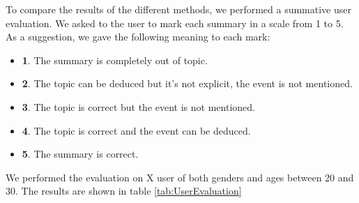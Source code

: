 To compare the results of the different methods, we performed a summative user evaluation. We asked to the user to mark each summary in a scale from 1 to 5. As a suggestion, we gave the following meaning to each mark:
\begin{itemize}
\item \textbf{1}. The summary is completely out of topic.
\item \textbf{2}. The topic can be deduced but it's not explicit, the event is not mentioned.
\item \textbf{3}. The topic is correct but the event is not mentioned.
\item \textbf{4}. The topic is correct and the event can be deduced.
\item \textbf{5}. The summary is correct.
\end{itemize}

We performed the evaluation on X user of both genders and ages between 20 and 30. The results are shown in table \ref{tab:UserEvaluation}


